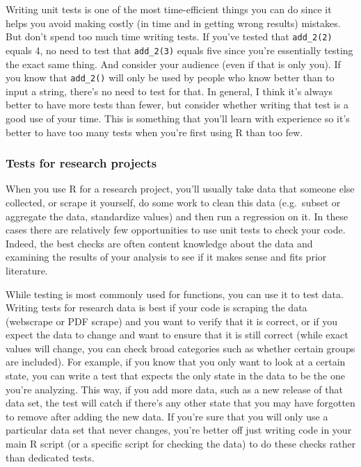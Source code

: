 \documentclass[
]{krantz}
\begin{document}
Writing unit tests is one of the most time-efficient things
you can do since it helps you avoid making costly (in time
and in getting wrong results) mistakes. But don't spend too
much time writing tests. If you've tested that
\texttt{add\_2(2)} equals 4, no need to test that
\texttt{add\_2(3)} equals five since you're essentially
testing the exact same thing. And consider your audience
(even if that is only you). If you know that
\texttt{add\_2()} will only be used by people who know
better than to input a string, there's no need to test for
that. In general, I think it's always better to have more
tests than fewer, but consider whether writing that test is
a good use of your time. This is something that you'll learn
with experience so it's better to have too many tests when
you're first using R than too few.

\hypertarget{tests-for-research-projects}{%
\subsubsection{Tests for research
projects}\label{tests-for-research-projects}}

When you use R for a research project, you'll usually take
data that someone else collected, or scrape it yourself, do
some work to clean this data (e.g.~subset or aggregate the
data, standardize values) and then run a regression on it.
In these cases there are relatively few opportunities to use
unit tests to check your code. Indeed, the best checks are
often content knowledge about the data and examining the
results of your analysis to see if it makes sense and fits
prior literature.

While testing is most commonly used for functions, you can
use it to test data. Writing tests for research data is best
if your code is scraping the data (webscrape or PDF scrape)
and you want to verify that it is correct, or if you expect
the data to change and want to ensure that it is still
correct (while exact values will change, you can check broad
categories such as whether certain groups are included). For
example, if you know that you only want to look at a certain
state, you can write a test that expects the only state in
the data to be the one you're analyzing. This way, if you
add more data, such as a new release of that data set, the
test will catch if there's any other state that you may have
forgotten to remove after adding the new data. If you're
sure that you will only use a particular data set that never
changes, you're better off just writing code in your main R
script (or a specific script for checking the data) to do
these checks rather than dedicated tests.
\end{document}
